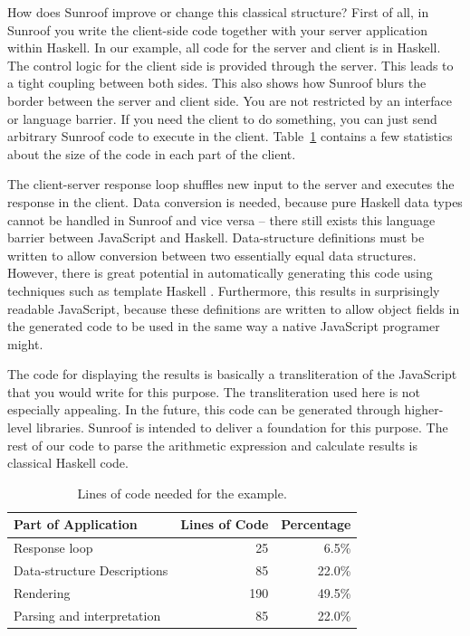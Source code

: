 \documentclass{llncs}
\newcommand{\TabRef}[1]{Table~\ref{#1}}
\begin{document}
How does Sunroof improve or change this classical structure?
First of all, in Sunroof you write the client-side code together with
your server application within Haskell. In our example, all code 
for the server and client is in Haskell. The control logic 
for the client side is provided through the server.
This leads to a tight coupling between both sides. 
This also shows how Sunroof blurs the border between the server 
and client side. You are not restricted by an interface or language 
barrier. If you need the client to do something, you can just 
send arbitrary Sunroof code to execute in the client.
%
\TabRef{tab:example-statistics} contains a few statistics 
about the size of the code in each part of the client.

The client-server response loop shuffles new input to the server 
and executes the response in the client.
%
Data conversion is needed, because pure Haskell data types
cannot be handled in Sunroof and vice versa -- there still
exists this language barrier between JavaScript and Haskell. 
Data-structure definitions must be written
to allow conversion between two essentially equal data structures.
However, there is great potential in automatically 
generating this code using techniques such as template Haskell
\cite{Sheard:02:TemplateMetaProgrammingHaskell}.
Furthermore, this results in surprisingly readable JavaScript,
because these definitions are written to allow object fields
in the generated code to be used in the same way a native JavaScript
programer might.

The code for displaying the results is basically a 
transliteration of the JavaScript that you would write for this 
purpose.
The transliteration used here is not especially appealing. 
In the future, this code can be generated through higher-level 
libraries. Sunroof is intended to deliver a foundation for
this purpose.
The rest of our code to parse the arithmetic expression and calculate 
results is classical Haskell code. 

\begin{table}[t]
\begin{center}
\vspace{0.1in}
\begin{tabular}{l@{\quad}r@{\quad}r}
\hline\rule{0pt}{12pt}%
Part of Application & Lines of Code & Percentage \\[2pt]
\hline\rule{0pt}{12pt}%
Response loop & 25 & 6.5\% \\[2pt]
Data-structure Descriptions & 85 & 22.0\% \\[2pt]
Rendering & 190 & 49.5\% \\[2pt]
Parsing and interpretation & 85 & 22.0\% \\[2pt]
\hline
\end{tabular}
\end{center}
\caption{Lines of code needed for the example.}
\label{tab:example-statistics}
\vspace{-0.5cm}
\end{table} 
\end{document}
